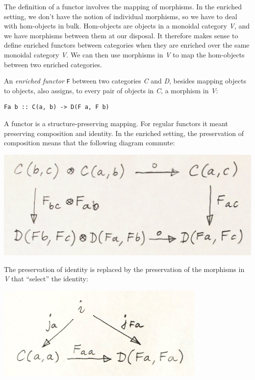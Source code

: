 The definition of a functor involves the mapping of morphisms. In the
enriched setting, we don't have the notion of individual morphisms, so
we have to deal with hom-objects in bulk. Hom-objects are objects in a
monoidal category \emph{V}, and we have morphisms between them at our
disposal. It therefore makes sense to define enriched functors between
categories when they are enriched over the same monoidal category
\emph{V}. We can then use morphisms in \emph{V} to map the hom-objects
between two enriched categories.

An \emph{enriched functor} \texttt{F} between two categories \emph{C}
and \emph{D}, besides mapping objects to objects, also assigns, to every
pair of objects in \emph{C}, a morphism in \emph{V}:

\begin{verbatim}
Fa b :: C(a, b) -> D(F a, F b)
\end{verbatim}

A functor is a structure-preserving mapping. For regular functors it
meant preserving composition and identity. In the enriched setting, the
preservation of composition means that the following diagram commute:

\includegraphics[width=5.31250in]{images/functorcomp.jpg}

The preservation of identity is replaced by the preservation of the
morphisms in \emph{V} that ``select'' the identity:

\includegraphics[width=4.04167in]{images/functorid.jpg}

